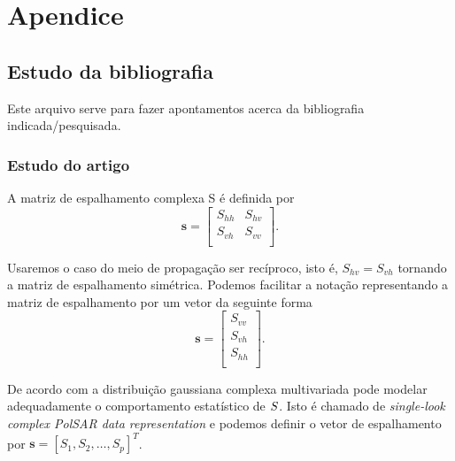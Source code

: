 \chapter{Apendice}
\label{apendice}
\section{Estudo da bibliografia}

Este arquivo serve para fazer apontamentos acerca da bibliografia indicada/pesquisada.

\subsection{Estudo do artigo~\cite{lee}}

A matriz de espalhamento complexa {\boldmath S} é definida por
$$
\mathbf{ s} = \left[
\begin{array}{cc}
	S_{hh}   & S_{hv}   \\
	S_{vh}   & S_{vv}   \\
\end{array}
\right].
$$

Usaremos o caso do meio de propagação ser recíproco, isto é, $S_{hv}=S_{vh}$ tornando a matriz de espalhamento simétrica. Podemos facilitar a notação representando a matriz de espalhamento por um vetor da seguinte forma
$$
\mathbf{s} = \left[
\begin{array}{c}
	S_{vv}      \\
	S_{vh}     \\
	S_{hh}      \\
\end{array}
\right].
$$

De acordo com \cite{good} a distribuição gaussiana complexa multivariada pode modelar adequadamente o comportamento estatístico de $\boldmath S$. Isto é chamado de {\it single-look complex PolSAR data representation} e podemos definir o vetor de espalhamento por $\mathbf{s}=[S_1,S_2,\dots,S_p]^T$. 

